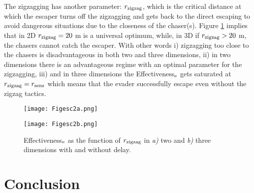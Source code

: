 \documentclass[12pt,a4paper,final]{iopart}
\begin{document}
The zigzagging has another  parameter: $r_{\rm zigzag}$, which is the critical distance at which the escaper turns off the zigzagging and gets back to the direct escaping to avoid dangerous situations due to the closeness of the chaser(s). Figure \ref{fig:zigg} implies that in 2D $r_{\rm zigzag} = 20$ m is a universal optimum, while, in 3D if $r_{\rm zigzag} > 20$ m, the chasers cannot catch the escaper. With other words i) zigzagging too close to the chasers is disadvantageous in both two and three dimensions, ii) in two dimensions there is an advantageous regime with an optimal parameter for the zigzagging, iii) and in three dimensions the Effectiveness$_{\rm e}$ gets saturated at $r_{\rm zigzag} = r_{\rm sens}$ which means that the evader successfully escape even without the zigzag tactics.
\begin{figure}[h]
\begin{minipage}[c]{0.485\textwidth}
\vspace{-5pt}
\texttt{[image: Figesc2a.png]}
\end{minipage}
\begin{minipage}[c]{0.5\textwidth}
\texttt{[image: Figesc2b.png]}
\end{minipage}\hfill
\caption{Effectiveness$_{\rm e}$ as the function of $r_{\rm zigzag}$ in {\it a)} two and  {\it b)} three dimensions with and without delay.}
\label{fig:zigg}
\end{figure}












\section{Conclusion }
\end{document}
